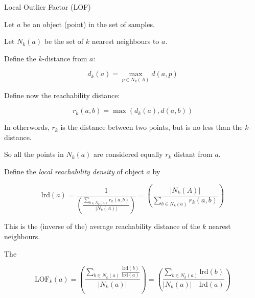 \begin{frame}{Local Outlier Factor (LOF)}
   {
    Let $a$ be an object (point) in the set of samples.

    Let $N_k(a)$ be the set of $k$ nearest neighbours to $a$.

    Define the $k$-distance from $a$:

    \begin{displaymath}
      d_k(a) = \max_{p\in N_k(A)} d(a, p)
    \end{displaymath}
  }
   {
    Define now the reachability distance:

    \begin{displaymath}
      r_k(a, b) = \max (d_k(a), d(a, b))
    \end{displaymath}

    In otherwords, $r_k$ is the distance between two points, but is no
    less than the $k$-distance.

    So all the points in $N_k(a)$ are considered equally $r_k$ distant
    from $a$.

    \bigskip
  }
   {
    Define the \textit{local reachability density} of object $a$ by

    \begin{displaymath}
      \mbox{lrd}(a) = \frac{1}{\left(
          \frac{
            \sum\limits_{b\in N_k(a)} r_k(a, b)
          }
          {|N_k(A)|}
        \right)}
      =
      \left(
      \frac
      {|N_k(A)|}
      {
        \displaystyle\sum_{b\in N_k(a)} r_k(a, b)
      }
      \right)
    \end{displaymath}

    This is the (inverse of the) average reachability distance of the
    $k$ nearest neighbours.
  }
   {
    The

    \begin{displaymath}
      \mbox{LOF}_k(a) = \left(
        \frac
        {\sum_{b\in N_k(a)} \frac{\mbox{lrd}(b)}{\mbox{lrd}(a)}}
        {|N_k(a)|}
        \right)
        =
        \left(
          \frac
          {\sum_{b\in N_k(a)} \mbox{lrd}(b)}
          {|N_k(a)|\quad \mbox{lrd}(a)}
        \right)
      \end{displaymath}

}
\end{frame}
